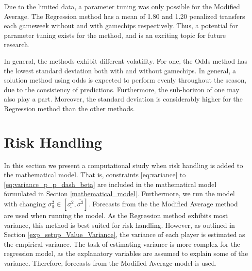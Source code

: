 \newpar

Due to the limited data, a parameter tuning was only possible for the Modified Average. The Regression method has a mean of 1.80 and 1.20 penalized transfers each gameweek without and with gamechips respectively. Thus, a potential for parameter tuning exists for the method, and is an exciting topic for future research.

\newpar 

In general, the methods exhibit different volatility. For one, the Odds method has the lowest standard deviation both with and without gamechips. In general, a solution method using odds is expected to perform evenly throughout the season, due to the consistency of predictions. Furthermore, the sub-horizon of one may also play a part. Moreover, the standard deviation is considerably higher for the Regression method than the other methods. 

\section{Risk Handling}

In this section we present a computational study when risk handling is added to the mathematical model. That is, constraints \ref{eq:variance} to \ref{eq:variance_p_p_dash_beta} are included in the mathematical model formulated in Section \ref{mathematical_model}. Furthermore, we run the model with changing $\sigma_{0}^2 \in [\underline{\sigma^2}, \overline{\sigma^2}]$. Forecasts from the the Modified Average method are used when running the model. As the Regression method exhibits most variance, this method is best suited for risk handling. However, as outlined in Section \ref{exp_setup_Value_Variance}, the variance of each player is estimated as the empirical variance. The task of estimating variance is more complex for the regression model, as the explanatory variables are assumed to explain some of the variance. Therefore, forecasts from the Modified Average model is used.

